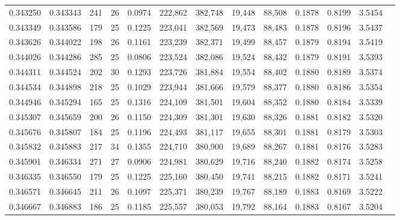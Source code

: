 \begin{tabular}{rrrrrrrrrrrrr}
0.343250 & 0.343343 &    241 &    26 &                                     0.0974 & 222,862 & 382,748 &  19,448 &  88,508 & 0.1878 & 0.8199 & 3.5454 \\
0.343349 & 0.343586 &    179 &    25 &                                     0.1225 & 223,041 & 382,569 &  19,473 &  88,483 & 0.1878 & 0.8196 & 3.5437 \\
0.343626 & 0.344022 &    198 &    26 &                                     0.1161 & 223,239 & 382,371 &  19,499 &  88,457 & 0.1879 & 0.8194 & 3.5419 \\
0.344026 & 0.344286 &    285 &    25 &                                     0.0806 & 223,524 & 382,086 &  19,524 &  88,432 & 0.1879 & 0.8191 & 3.5393 \\
0.344311 & 0.344524 &    202 &    30 &                                     0.1293 & 223,726 & 381,884 &  19,554 &  88,402 & 0.1880 & 0.8189 & 3.5374 \\
0.344534 & 0.344898 &    218 &    25 &                                     0.1029 & 223,944 & 381,666 &  19,579 &  88,377 & 0.1880 & 0.8186 & 3.5354 \\
0.344946 & 0.345294 &    165 &    25 &                                     0.1316 & 224,109 & 381,501 &  19,604 &  88,352 & 0.1880 & 0.8184 & 3.5339 \\
0.345307 & 0.345659 &    200 &    26 &                                     0.1150 & 224,309 & 381,301 &  19,630 &  88,326 & 0.1881 & 0.8182 & 3.5320 \\
0.345676 & 0.345807 &    184 &    25 &                                     0.1196 & 224,493 & 381,117 &  19,655 &  88,301 & 0.1881 & 0.8179 & 3.5303 \\
0.345832 & 0.345883 &    217 &    34 &                                     0.1355 & 224,710 & 380,900 &  19,689 &  88,267 & 0.1881 & 0.8176 & 3.5283 \\
0.345901 & 0.346334 &    271 &    27 &                                     0.0906 & 224,981 & 380,629 &  19,716 &  88,240 & 0.1882 & 0.8174 & 3.5258 \\
0.346335 & 0.346550 &    179 &    25 &                                     0.1225 & 225,160 & 380,450 &  19,741 &  88,215 & 0.1882 & 0.8171 & 3.5241 \\
0.346571 & 0.346645 &    211 &    26 &                                     0.1097 & 225,371 & 380,239 &  19,767 &  88,189 & 0.1883 & 0.8169 & 3.5222 \\
0.346667 & 0.346883 &    186 &    25 &                                     0.1185 & 225,557 & 380,053 &  19,792 &  88,164 & 0.1883 & 0.8167 & 3.5204 \\

\end{tabular}
